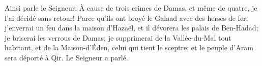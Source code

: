Ainsi parle le Seigneur:
	À cause de trois crimes de Damas, et même de quatre, je l’ai décidé sans retour!
Parce qu’ils ont broyé le Galaad avec des herses de fer,
	j’enverrai un feu dans la maison d’Hazaël, et il dévorera les palais de Ben-Hadad;
	je briserai les verrous de Damas;
	je supprimerai de la Vallée-du-Mal tout habitant,
	et de la Maison-d’Éden, celui qui tient le sceptre;
	et le peuple d’Aram sera déporté à Qir. Le Seigneur a parlé.
